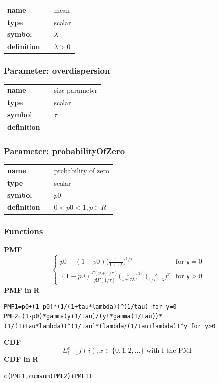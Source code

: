 \noindent\begin{tabular}{p{2cm}cl}
\textbf{name} & & mean \\
\textbf{type} & & scalar \\
\textbf{symbol} & & $\lambda$  \\
\textbf{definition} & & $\lambda > 0$
\end{tabular}
\subsubsection*{Parameter: overdispersion}

\noindent\begin{tabular}{p{2cm}cl}
\textbf{name} & & size parameter \\
\textbf{type} & & scalar \\
\textbf{symbol} & & $\tau$  \\
\textbf{definition} & & $-$
\end{tabular}
\subsubsection*{Parameter: probabilityOfZero}

\noindent\begin{tabular}{p{2cm}cl}
\textbf{name} & & probability of zero \\
\textbf{type} & & scalar \\
\textbf{symbol} & & $p0$  \\
\textbf{definition} & & $0<p0<1, p \in R$
\end{tabular}
\subsubsection*{Functions}

\smallskip \noindent \hspace{.2cm} \textbf{PMF} 
\begin{equation*}
\begin{cases}
p0 + (1-p0) \Big(\frac{1}{1 + \tau\lambda} \Big)^{1/\tau} & \text{for } y = 0 \\ 
(1-p0) \frac{\Gamma(y+1/\tau)}{y!\Gamma(1/\tau)} \Big(\frac{1}{1 + \tau\lambda} \Big)^{1/\tau} 
\Big(\frac{\lambda}{1/\tau + \lambda} \Big)^{y} & \text{for } y > 0
\end{cases}
\end{equation*}
\smallskip \noindent \hspace{.2cm} \textbf{PMF in R}  
\begin{verbatim}
PMF1=p0+(1-p0)*(1/(1+tau*lambda))^(1/tau) for y=0
PMF2=(1-p0)*gamma(y+1/tau)/(y!*gamma(1/tau))*(1/(1+tau*lambda))^(1/tau)*(lambda/(1/tau+lambda))^y for y>0
\end{verbatim}
\smallskip \noindent \hspace{.2cm} \textbf{CDF} 
\begin{equation*}\Sigma_{i=1}^x f(i), x \in \{0,1,2,...\}
\text { with f the PMF}\end{equation*}
\smallskip \noindent \hspace{.2cm} \textbf{CDF in R}  
\begin{verbatim}
c(PMF1,cumsum(PMF2)+PMF1)
\end{verbatim}
\smallskip
